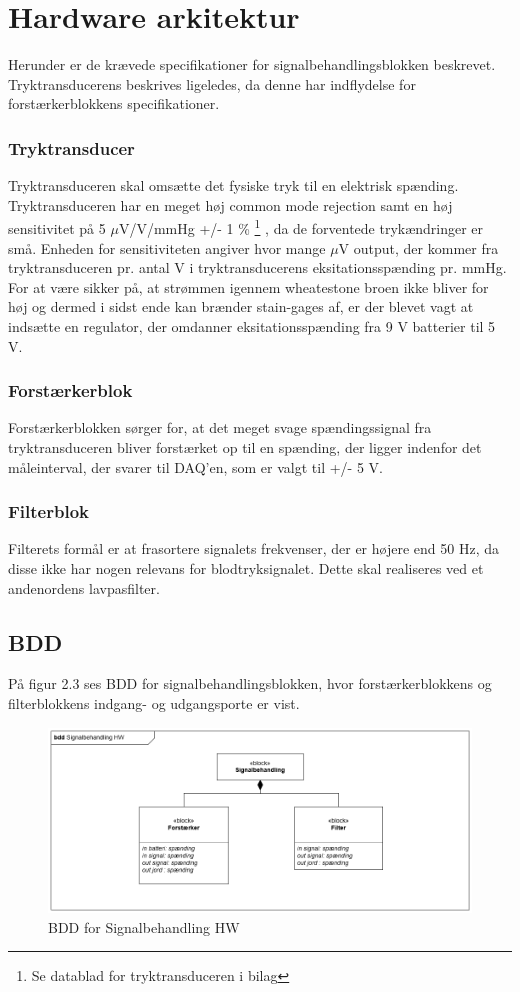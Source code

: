 \section{Hardware arkitektur}
Herunder er de krævede specifikationer for signalbehandlingsblokken beskrevet. Tryktransducerens beskrives ligeledes, da denne har indflydelse for forstærkerblokkens specifikationer. 

\subsubsection{Tryktransducer}
Tryktransduceren skal omsætte det fysiske tryk til en elektrisk spænding. Tryktransduceren har en meget høj common mode rejection samt en høj sensitivitet på 5 $\mu$V/V/mmHg +/- 1 \% \footnote{Se datablad for tryktransduceren i bilag} , da de forventede trykændringer er små. Enheden for sensitiviteten angiver hvor mange $\mu$V output, der kommer fra tryktransduceren pr. antal V i tryktransducerens eksitationsspænding pr. mmHg. For at være sikker på, at strømmen igennem wheatestone broen ikke bliver for høj og dermed i sidst ende kan brænder stain-gages af, er der blevet vagt at indsætte en regulator, der omdanner eksitationsspænding fra 9 V batterier til 5 V. 

\subsubsection{Forstærkerblok}
Forstærkerblokken sørger for, at det meget svage spændingssignal fra tryktransduceren bliver forstærket op til en spænding, der ligger indenfor det måleinterval, der svarer til DAQ'en, som er valgt til +/- 5 V.
 
\subsubsection{Filterblok}
Filterets formål er at frasortere signalets frekvenser, der er højere end 50 Hz, da disse ikke har nogen relevans for blodtryksignalet. Dette skal realiseres ved et andenordens lavpasfilter. 
 
\subsection{BDD}
På figur 2.3 ses BDD for signalbehandlingsblokken, hvor forstærkerblokkens og filterblokkens indgang- og udgangsporte er vist.  
\begin{figure}[H]
	\centering
	\includegraphics[width=1\textwidth]{Figurer/4}
	\caption{BDD for Signalbehandling HW}
	\label{fig:BDDhw-diagram}
\end{figure}

